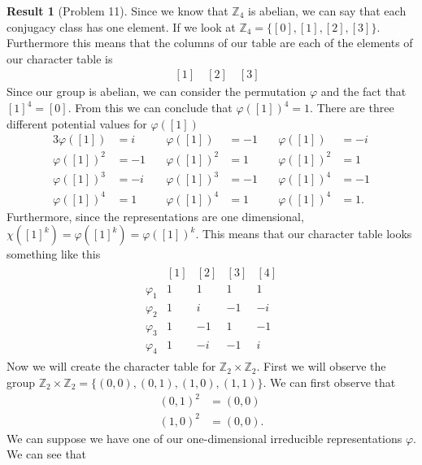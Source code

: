 \documentclass[titlepage]{article}
\theoremstyle{plain}
\theoremstyle{definition}
\newtheorem{result}{Result}[section]
\theoremstyle{remark}
\theoremstyle{exercise-style}
\numberwithin{equation}{section}
\numberwithin{theorem}{section}
\numberwithin{remark}{section}
\begin{document}
\begin{result}[Problem 11]
    Since we know that $\mathbb Z_4$ is abelian, we can say that each conjugacy class has one element. If we look at $\mathbb{Z}_4 = \{ [0],[1],[2], [3] \}$. Furthermore this means that the columns of our table are each of the elements of our character table is
    \begin{align}
       [0] \quad [1] \quad [2] \quad [3]
    \end{align}
    Since our group is abelian, we can consider the permutation $\varphi$ and the fact that $[1]^4 = [0]$. From this we can conclude that $\varphi([1])^4 = 1$. There are three different potential values for $\varphi([1])$
    \begin{alignat}{3}
       \varphi([1]) &=i  &\quad \varphi ([1]) &= -1  &\quad \varphi ([1]) &= -i \\
       \varphi ([1])^2 &= -1 &\quad \varphi([1])^2 &= 1 &\quad \varphi([1])^2 &= 1 \\
       \varphi ([1])^3 &= -i &\quad \varphi([1])^3 &= -1 &\quad \varphi([1])^4 &= -1 \\
       \varphi ([1])^4 &= 1 &\quad \varphi([1])^4 &= 1 &\quad \varphi([1])^4 &= 1.
    \end{alignat}
    Furthermore, since the representations are one dimensional, $\chi([1]^k)=\varphi([1]^k) = \varphi ([1])^k$.
    This means that our character table looks something like this
    \begin{align}
        \begin{array}{c|c|c|c|c}
             & [1] & [2] & [3] & [4]\\
             \hline
            \varphi_1 & 1 & 1 & 1 & 1\\
            \varphi_2 & 1 & i & -1 & -i\\
            \varphi_3 & 1 & -1 & 1 & -1\\
            \varphi_4 & 1 & -i & -1 & i
        \end{array}
    \end{align}
    Now we will create the character table for $\mathbb{Z}_2 \times \mathbb{Z}_2$. First we will observe the group $\mathbb Z_2 \times \mathbb Z_2 = \{ (0,0), (0,1), (1,0), (1,1) \} $. We can first observe that 
    \begin{align}
        (0,1)^2 &= (0,0) \\
        (1,0)^2 &= (0,0).
    \end{align}
    We can suppose we have one of our one-dimensional irreducible representations $\varphi$. We can see that

\end{result}
\end{document}
